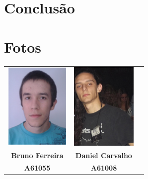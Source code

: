 \documentclass[a5paper,twocolumn, 11pt]{article}
\begin{document}
\newpage
\twocolumn







\clearpage
\section{Conclusão}






\clearpage
\onecolumn
\section{Fotos}
\begin{center}
    \begin{tabular}{ccc}
        \includegraphics[width=90pt]{bruno.png}&
        \includegraphics[width=90pt]{daniel.png}\\
        
        \small{\textbf{Bruno Ferreira}}&
        \small{\textbf{Daniel Carvalho}}\\
        \small{\textbf{A61055}}&
        \small{\textbf{A61008}}\\
    \end{tabular}
\end{center}
\end{document}
